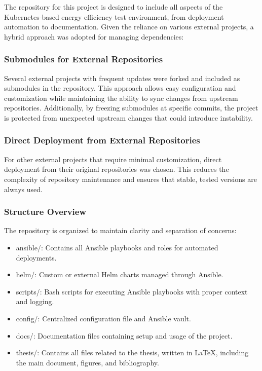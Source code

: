 The repository for this project is designed to include all aspects of the Kubernetes-based energy efficiency test environment, from deployment automation to documentation. Given the reliance on various external projects, a hybrid approach was adopted for managing dependencies:

\subsubsection{Submodules for External Repositories}
Several external projects with frequent updates were forked and included as submodules in the repository. This approach allows easy configuration and customization while maintaining the ability to sync changes from upstream repositories. Additionally, by freezing submodules at specific commits, the project is protected from unexpected upstream changes that could introduce instability.

\subsubsection{Direct Deployment from External Repositories}
For other external projects that require minimal customization, direct deployment from their original repositories was chosen. This reduces the complexity of repository maintenance and ensures that stable, tested versions are always used.

\subsubsection{Structure Overview}
The repository is organized to maintain clarity and separation of concerns:
\begin{itemize}
    \item ansible/: Contains all Ansible playbooks and roles for automated deployments.
    \item helm/: Custom or external Helm charts managed through Ansible.
    \item scripts/: Bash scripts for executing Ansible playbooks with proper context and logging.
    \item config/: Centralized configuration file and Ansible vault.
    \item docs/: Documentation files containing setup and usage of the project.
    \item thesis/: Contains all files related to the thesis, written in LaTeX, including the main document, figures, and bibliography.
\end{itemize}

